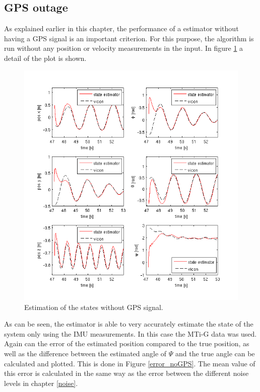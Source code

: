 \FloatBarrier

\subsection{GPS outage}\label{no_GPS}
As explained earlier in this chapter, the performance of a estimator without having a GPS signal is an important criterion. For this purpose, the algorithm is run without any position or velocity measurements in the input. In figure \ref{detail_noGPS} a detail of the plot is shown.
\begin{figure}[hb]
\centering
\includegraphics[width=1\textwidth]{pictures/2_2_detail_noGPS.png}
\caption{Estimation of the states without GPS signal.}
\label{detail_noGPS}
\end{figure}
As can be seen, the estimator is able to very accurately estimate the state of the system only using the IMU measurements. In this case the MTi-G data was used. Again can the error of the estimated position compared to the true position, as well as the difference between the estimated angle of $\Psi$ and the true angle can be calculated and plotted. This is done in Figure \ref{error_noGPS}. The mean value of this error is calculated in the same way as the error between the different noise levels in chapter \ref{noise}.
